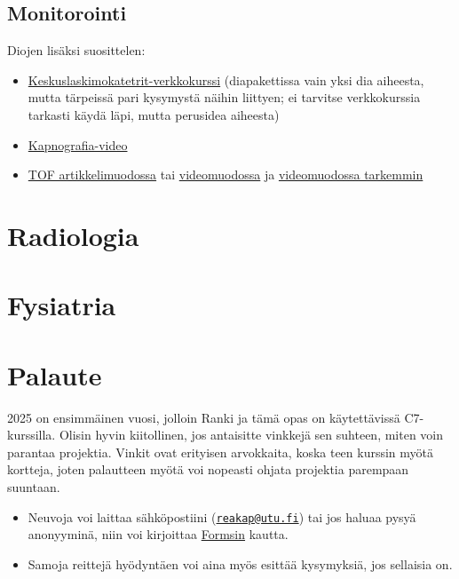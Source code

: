 \documentclass[
]{book}
\providecommand{\tightlist}{%
  \setlength{\itemsep}{0pt}\setlength{\parskip}{0pt}}
\begin{document}
\section{Monitorointi}\label{monitorointi}

Diojen lisäksi suosittelen:

\begin{itemize}
\tightlist
\item
  \href{https://www.oppiportti.fi/dvk00057}{Keskuslaskimokatetrit-verkkokurssi} (diapakettissa vain yksi dia aiheesta, mutta tärpeissä pari kysymystä näihin liittyen; ei tarvitse verkkokurssia tarkasti käydä läpi, mutta perusidea aiheesta)
\item
  \href{https://youtu.be/fLfHsuWYbdc?si=x942lC9NxLq4E7Ca}{Kapnografia-video}
\item
  \href{https://say.fi/files/illman_relaksaatio.pdf}{TOF artikkelimuodossa} tai \href{https://youtu.be/b61fpDNZOcU?si=VxuzU94RuK7FemSP}{videomuodossa} ja \href{https://youtu.be/kqUAgtV3Bb4?si=cdcMjGGZh-usSWY0}{videomuodossa tarkemmin}
\end{itemize}

\chapter{Radiologia}\label{radiologia}

\chapter{Fysiatria}\label{fysiatria}

\chapter{Palaute}\label{palaute}

2025 on ensimmäinen vuosi, jolloin Ranki ja tämä opas on käytettävissä C7-kurssilla. Olisin hyvin kiitollinen, jos antaisitte vinkkejä sen suhteen, miten voin parantaa projektia. Vinkit ovat erityisen arvokkaita, koska teen kurssin myötä kortteja, joten palautteen myötä voi nopeasti ohjata projektia parempaan suuntaan.

\begin{itemize}
\item
  Neuvoja voi laittaa sähköpostiini (\href{mailto:reakap@utu.fi}{\nolinkurl{reakap@utu.fi}}) tai jos haluaa pysyä anonyyminä, niin voi kirjoittaa \href{https://docs.google.com/forms/d/e/1FAIpQLSericnXGU2U_h7stCFVZ5X0-6Q9BLGdiDugun_Mex3kf_bTpg/viewform?usp=sharing&ouid=112689903880978617225}{Formsin} kautta.
\item
  Samoja reittejä hyödyntäen voi aina myös esittää kysymyksiä, jos sellaisia on.
\end{itemize}


\end{document}
